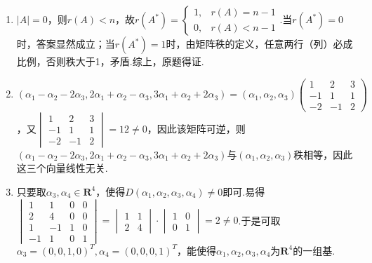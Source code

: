 \begin{enumerate}
    \item $|A|=0$，则$r(A)<n$，故$r(A^*)=\begin{cases}
        1,&r(A)=n-1\\
        0,&r(A)<n-1
    \end{cases}$.当$r(A^*)=0$时，答案显然成立；当$r(A^*)=1$时，由矩阵秩的定义，任意两行（列）必成比例，否则秩大于1，矛盾.综上，原题得证.
    \item $(\alpha_1-\alpha_2-2\alpha_3,2\alpha_1+\alpha_2-\alpha_3,3\alpha_1+\alpha_2+2\alpha_3)=(\alpha_1,\alpha_2,\alpha_3)\begin{pmatrix}
        1 & 2 & 3 \\ -1 & 1 & 1 \\ -2 & -1 & 2
    \end{pmatrix}$，又$\begin{vmatrix}
        1 & 2 & 3 \\ -1 & 1 & 1 \\ -2 & -1 & 2
    \end{vmatrix}=12\neq 0$，因此该矩阵可逆，则$(\alpha_1-\alpha_2-2\alpha_3,2\alpha_1+\alpha_2-\alpha_3,3\alpha_1+\alpha_2+2\alpha_3)$与$(\alpha_1,\alpha_2,\alpha_3)$秩相等，因此这三个向量线性无关.
    \item 只要取$\alpha_3,\alpha_4 \in \mathbf{R}^4$，使得$D(\alpha_1,\alpha_2,\alpha_3,\alpha_4) \neq 0$即可.易得$\begin{vmatrix}
        1 & 1 & 0 & 0 \\
        2 & 4 & 0 & 0 \\
        1 & -1 & 1 & 0 \\
        -1 & 1 & 0 & 1
    \end{vmatrix}=\begin{vmatrix}
        1 & 1 \\
        2 & 4
    \end{vmatrix} \cdot \begin{vmatrix}
        1 & 0 \\
        0 & 1
    \end{vmatrix}=2 \neq 0$.于是可取$\alpha_3=(0,0,1,0)^T,\alpha_4=(0,0,0,1)^T$，能使得${\alpha_1,\alpha_2,\alpha_3,\alpha_4}$为$\mathbf{R}^4$的一组基.
\end{enumerate}

